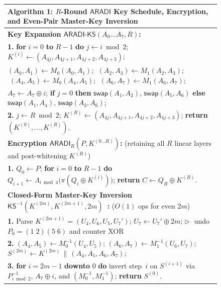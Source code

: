 \documentclass[11pt,a4paper]{article}
\theoremstyle{definition}
\theoremstyle{remark}
\newcommand{\ARADI}{\mathsf{ARADI}}
\begin{document}
\begin{figure}[t]
\centering
\small
\begin{tabular}{@{}p{}@{}}
\toprule
\textbf{Algorithm 1:} $R$-Round $\ARADI$ Key Schedule, Encryption, and Even-Pair Master-Key Inversion~\cite{GMW24,DG25} \\
\midrule
\textbf{Key Expansion $\mathsf{ARADI\text{-}KS}(A_0 \dots A_7, R)$:} \\
\hspace*{1.2em} \textbf{1.} \textbf{for} $i = 0$ \textbf{to} $R - 1$ \textbf{do} \quad $j \leftarrow i \bmod 2$; \quad $K^{(i)} \leftarrow (A_{4j}, A_{4j+1}, A_{4j+2}, A_{4j+3})$; \\
\hspace*{2.8em} $(A_0, A_1) \leftarrow M_0(A_0, A_1)$; $\;(A_2, A_3) \leftarrow M_1(A_2, A_3)$; $\;(A_4, A_5) \leftarrow M_0(A_4, A_5)$; $\;(A_6, A_7) \leftarrow M_1(A_6, A_7)$; \\
\hspace*{2.8em} $A_7 \leftarrow A_7 \oplus i$; \quad \textbf{if} $j = 0$ \textbf{then} $\mathsf{swap}(A_1,A_2),\, \mathsf{swap}(A_5,A_6)$ \textbf{else} $\mathsf{swap}(A_1,A_4),\, \mathsf{swap}(A_3,A_6)$; \\
\hspace*{1.2em} \textbf{2.} $j \leftarrow R \bmod 2$; \quad $K^{(R)} \leftarrow (A_{4j}, A_{4j+1}, A_{4j+2}, A_{4j+3})$; \quad \textbf{return} $(K^{(0)}, \dots, K^{(R)})$. \\[3pt]
\midrule
\textbf{Encryption $\mathsf{ARADI}_R(P, K^{(0 \dots R)})$:} \hfill (retaining all $R$ linear layers and post-whitening $K^{(R)}$) \\
\hspace*{1.2em} \textbf{1.} $Q_0 \leftarrow P$; \quad \textbf{for} $i = 0$ \textbf{to} $R - 1$ \textbf{do} $Q_{i+1} \leftarrow \Lambda_{i \bmod 4}\bigl(\pi(Q_i \oplus K^{(i)})\bigr)$; \quad \textbf{return} $C \leftarrow Q_R \oplus K^{(R)}$. \\[3pt]
\midrule
\textbf{Closed-Form Master-Key Inversion $\mathsf{KS}^{-1}(K^{(2m)}, K^{(2m+1)}, 2m)$~\cite[Remark~5]{DG25}:} \hfill ($O(1)$ ops for even $2m$) \\
\hspace*{1.2em} \textbf{1.} Parse $K^{(2m+1)} = (U_4, U_6, U_5, U_7')$; \quad $U_7 \leftarrow U_7' \oplus 2m$; \hfill $\triangleright\;$ undo $P_0 = (1\;2)(5\;6)$ and counter XOR \\
\hspace*{1.2em} \textbf{2.} $(A_4, A_5) \leftarrow M_0^{-1}(U_4, U_5)$; \quad $(A_6, A_7) \leftarrow M_1^{-1}(U_6, U_7)$; \quad $S^{(2m)} \leftarrow K^{(2m)} \,\|\, (A_4, A_5, A_6, A_7)$; \\
\hspace*{1.2em} \textbf{3.} \textbf{for} $i = 2m - 1$ \textbf{downto} $0$ \textbf{do} invert step~$i$ on $S^{(i+1)}$ via $P_{i\bmod 2}^{-1}$, $A_7 \oplus i$, and $(M_0^{-1}, M_1^{-1})$; \textbf{return} $S^{(0)}$. \\
\bottomrule
\end{tabular}
\end{figure}
\end{document}

